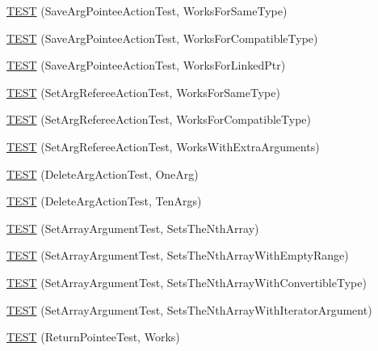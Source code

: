 \begin{DoxyCompactItemize}
\item 
\hyperlink{namespacetesting_1_1gmock__more__actions__test_a51d471708cb6fa3c403ea1d936a49dc1}{T\+E\+ST} (Save\+Arg\+Pointee\+Action\+Test, Works\+For\+Same\+Type)
\item 
\hyperlink{namespacetesting_1_1gmock__more__actions__test_a35b74b32b6a222e048706e6ce8d64118}{T\+E\+ST} (Save\+Arg\+Pointee\+Action\+Test, Works\+For\+Compatible\+Type)
\item 
\hyperlink{namespacetesting_1_1gmock__more__actions__test_afc168d80fe8ca16f0efc874587574e64}{T\+E\+ST} (Save\+Arg\+Pointee\+Action\+Test, Works\+For\+Linked\+Ptr)
\item 
\hyperlink{namespacetesting_1_1gmock__more__actions__test_aa9fa575b30dca09e9886722b78415a22}{T\+E\+ST} (Set\+Arg\+Referee\+Action\+Test, Works\+For\+Same\+Type)
\item 
\hyperlink{namespacetesting_1_1gmock__more__actions__test_af5a15dbcba14010a5463f3ac9451ab8a}{T\+E\+ST} (Set\+Arg\+Referee\+Action\+Test, Works\+For\+Compatible\+Type)
\item 
\hyperlink{namespacetesting_1_1gmock__more__actions__test_a0ea4f3d8f1a643726e37825c58d8741f}{T\+E\+ST} (Set\+Arg\+Referee\+Action\+Test, Works\+With\+Extra\+Arguments)
\item 
\hyperlink{namespacetesting_1_1gmock__more__actions__test_a575e9a6f5bfcc133188e973147697425}{T\+E\+ST} (Delete\+Arg\+Action\+Test, One\+Arg)
\item 
\hyperlink{namespacetesting_1_1gmock__more__actions__test_a972b47a7e96b95606190afa928ea2db4}{T\+E\+ST} (Delete\+Arg\+Action\+Test, Ten\+Args)
\item 
\hyperlink{namespacetesting_1_1gmock__more__actions__test_aacf568e3d16b210aa2316ccc2cb6b22d}{T\+E\+ST} (Set\+Array\+Argument\+Test, Sets\+The\+Nth\+Array)
\item 
\hyperlink{namespacetesting_1_1gmock__more__actions__test_a63a338ef41086b80dba5729ecd1073e5}{T\+E\+ST} (Set\+Array\+Argument\+Test, Sets\+The\+Nth\+Array\+With\+Empty\+Range)
\item 
\hyperlink{namespacetesting_1_1gmock__more__actions__test_a42955fc99954c095f9d7ded3b92c091f}{T\+E\+ST} (Set\+Array\+Argument\+Test, Sets\+The\+Nth\+Array\+With\+Convertible\+Type)
\item 
\hyperlink{namespacetesting_1_1gmock__more__actions__test_a5db6a5413414f6d9bb8a24d1f07bf882}{T\+E\+ST} (Set\+Array\+Argument\+Test, Sets\+The\+Nth\+Array\+With\+Iterator\+Argument)
\item 
\hyperlink{namespacetesting_1_1gmock__more__actions__test_a690ef20bd9c281781eddcf99b18cff6c}{T\+E\+ST} (Return\+Pointee\+Test, Works)
\end{DoxyCompactItemize}
